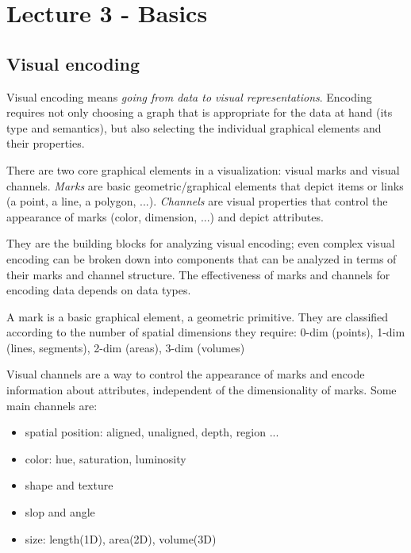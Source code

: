 \chapter{Lecture 3 - Basics}
\section{Visual encoding}
Visual encoding means \emph{going from data to visual representations}. Encoding requires not only choosing a graph that is appropriate for the data at hand (its type and semantics), but also selecting the individual graphical elements and their properties.\par
There are two core graphical elements in a visualization: visual marks and visual channels. \emph{Marks} are basic geometric/graphical elements that depict items or links (a point, a line, a polygon, ...). \emph{Channels} are visual properties that control the appearance of marks (color, dimension, ...) and depict attributes.\par
They are the building blocks for analyzing visual encoding; even complex visual encoding can be broken down into components that can be analyzed in terms of their marks and channel structure. The effectiveness of marks and channels for encoding data depends on data types.

\begin{definition}[Marks]
    A mark is a basic graphical element, a geometric primitive. They are classified according to the number of spatial dimensions they require: 0-dim (points), 1-dim (lines, segments), 2-dim (areas), 3-dim (volumes)
\end{definition}

\begin{definition}[Channels]
    Visual channels are a way to control the appearance of marks and encode information about attributes, independent of the dimensionality of marks. Some main channels are:
    \begin{itemize}[noitemsep]
        \item spatial position: aligned, unaligned, depth, region ...
        \item color: hue, saturation, luminosity
        \item shape and texture
        \item slop and angle
        \item size: length(1D), area(2D), volume(3D)
    \end{itemize}
\end{definition}

